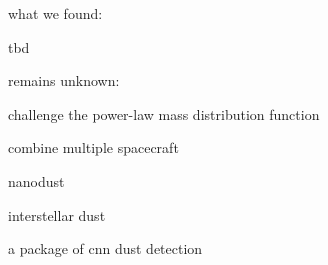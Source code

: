 what we found:

tbd


remains unknown:

challenge the power-law mass distribution function

combine multiple spacecraft

nanodust

interstellar dust

a package of cnn dust detection









